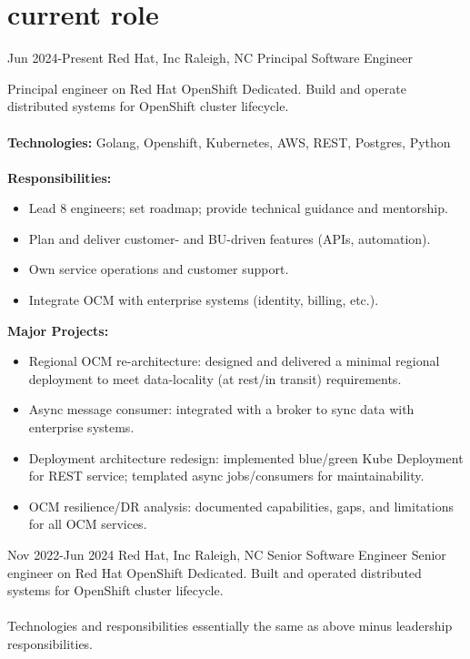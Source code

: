 
\section{current role}

\begin{entrylist}


\workentry
{Jun 2024-Present}
{Red Hat, Inc}
{Raleigh, NC}
{Principal Software Engineer}
{Principal engineer on Red Hat OpenShift Dedicated. Build and operate distributed systems for OpenShift cluster lifecycle. \\
\\
\textbf{Technologies:} Golang, Openshift, Kubernetes, AWS, REST, Postgres, Python \\
\\
\textbf{Responsibilities:}
\begin{itemize}
\item Lead 8 engineers; set roadmap; provide technical guidance and mentorship.
\item Plan and deliver customer- and BU-driven features (APIs, automation).
\item Own service operations and customer support.
\item Integrate OCM with enterprise systems (identity, billing, etc.).
\end{itemize}
\textbf{Major Projects:}
\begin{itemize}
\item Regional OCM re-architecture: designed and delivered a minimal regional deployment to meet data-locality (at rest/in transit) requirements. 
\item Async message consumer: integrated with a broker to sync data with enterprise systems.
\item Deployment architecture redesign: implemented blue/green Kube Deployment for REST service; templated async jobs/consumers for maintainability.
\item OCM resilience/DR analysis: documented capabilities, gaps, and limitations for all OCM services. 
\end{itemize}
}

\workentry
{Nov 2022-Jun 2024}
{Red Hat, Inc}
{Raleigh, NC}
{Senior Software Engineer}
{Senior engineer on Red Hat OpenShift Dedicated. Built and operated distributed systems for OpenShift cluster lifecycle. \\
\\
Technologies and responsibilities essentially the same as above minus leadership responsibilities.
}


\end{entrylist}
